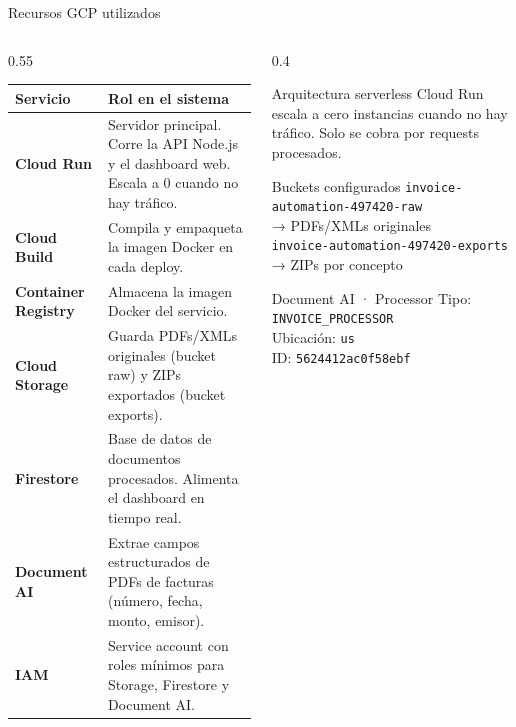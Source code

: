 \documentclass[aspectratio=169]{beamer}
\begin{document}
\begin{frame}{Recursos GCP utilizados}
\begin{columns}[T]
\begin{column}{0.55\textwidth}
  \begin{tabular}{@{}p{3.2cm}p{5cm}@{}}
    \toprule
    \textbf{Servicio} & \textbf{Rol en el sistema} \\
    \midrule
    \textbf{Cloud Run} & Servidor principal. Corre la API Node.js y el dashboard web. Escala a 0 cuando no hay tráfico. \\
    \textbf{Cloud Build} & Compila y empaqueta la imagen Docker en cada deploy. \\
    \textbf{Container Registry} & Almacena la imagen Docker del servicio. \\
    \textbf{Cloud Storage} & Guarda PDFs/XMLs originales (bucket raw) y ZIPs exportados (bucket exports). \\
    \textbf{Firestore} & Base de datos de documentos procesados. Alimenta el dashboard en tiempo real. \\
    \textbf{Document AI} & Extrae campos estructurados de PDFs de facturas (número, fecha, monto, emisor). \\
    \textbf{IAM} & Service account con roles mínimos para Storage, Firestore y Document AI. \\
    \bottomrule
  \end{tabular}
\end{column}
\begin{column}{0.4\textwidth}
  \begin{alertblock}{Arquitectura serverless}
    Cloud Run escala a cero instancias cuando no hay tráfico. Solo se cobra por requests procesados.
  \end{alertblock}

  \vspace{0.4cm}

  \begin{block}{Buckets configurados}
    \footnotesize
    \texttt{invoice-automation-497420-raw}\\
    \quad → PDFs/XMLs originales\\[4pt]
    \texttt{invoice-automation-497420-exports}\\
    \quad → ZIPs por concepto
  \end{block}

  \vspace{0.4cm}

  \begin{block}{Document AI · Processor}
    \footnotesize
    Tipo: \texttt{INVOICE\_PROCESSOR}\\
    Ubicación: \texttt{us}\\
    ID: \texttt{5624412ac0f58ebf}
  \end{block}
\end{column}
\end{columns}
\end{frame}
\end{document}
